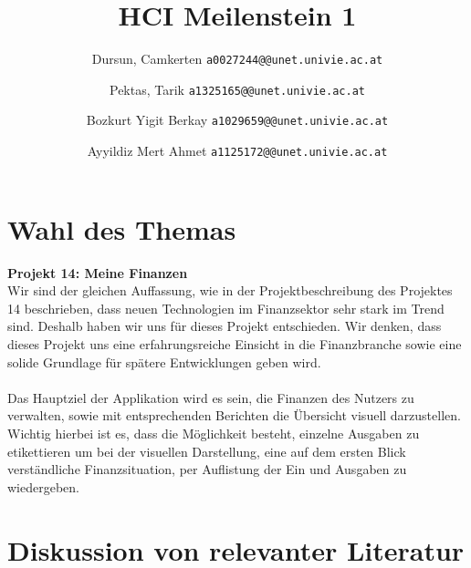 \documentclass[runningheads,a4paper]{llncs}
\begin{document}
\mainmatter  %

\title{HCI Meilenstein 1}


\author{
  Dursun, Camkerten
  \texttt{a0027244@@unet.univie.ac.at}
  \and
  Pektas, Tarik
  \texttt{a1325165@@unet.univie.ac.at}
  \and
  Bozkurt Yigit Berkay
  \texttt{a1029659@@unet.univie.ac.at}
  \and
  Ayyildiz Mert Ahmet
  \texttt{a1125172@@unet.univie.ac.at}
}



\maketitle

\section{Wahl des Themas}
\textbf {Projekt 14: Meine Finanzen}\\

Wir sind der gleichen Auffassung, wie in der Projektbeschreibung des Projektes 14 beschrieben, dass neuen Technologien im Finanzsektor sehr stark im Trend sind. Deshalb haben wir uns für dieses Projekt entschieden. Wir denken, dass dieses Projekt uns eine erfahrungsreiche Einsicht in die Finanzbranche sowie eine solide Grundlage für spätere Entwicklungen geben wird. \\\\Das Hauptziel der Applikation wird  es sein, die Finanzen des Nutzers zu verwalten, sowie mit entsprechenden Berichten die Übersicht visuell darzustellen. Wichtig hierbei ist es, dass die Möglichkeit besteht, einzelne Ausgaben zu etikettieren um bei der visuellen Darstellung, eine auf dem ersten Blick verständliche Finanzsituation, per Auflistung der Ein und Ausgaben zu wiedergeben. 


\section{Diskussion von relevanter Literatur}
\end{document}

